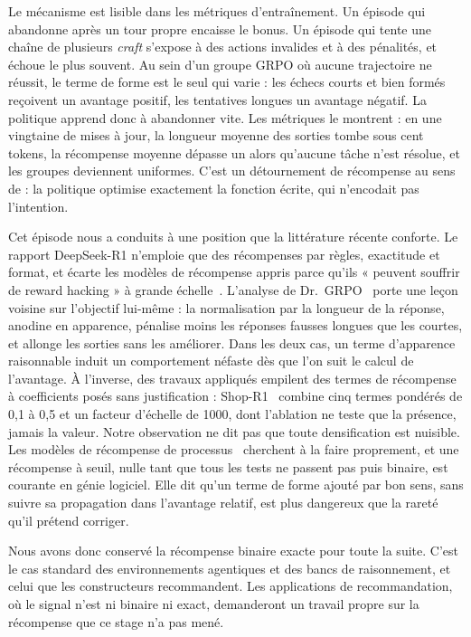\documentclass[11pt,a4paper]{article}
\begin{document}
Le mécanisme est lisible dans les métriques d'entraînement. Un épisode qui abandonne après un tour propre encaisse le bonus. Un épisode qui tente une chaîne de plusieurs \emph{craft} s'expose à des actions invalides et à des pénalités, et échoue le plus souvent. Au sein d'un groupe GRPO où aucune trajectoire ne réussit, le terme de forme est le seul qui varie : les échecs courts et bien formés reçoivent un avantage positif, les tentatives longues un avantage négatif. La politique apprend donc à abandonner vite. Les métriques le montrent : en une vingtaine de mises à jour, la longueur moyenne des sorties tombe sous cent tokens, la récompense moyenne dépasse un alors qu'aucune tâche n'est résolue, et les groupes deviennent uniformes. C'est un détournement de récompense au sens de \cite{skalse2022defining} : la politique optimise exactement la fonction écrite, qui n'encodait pas l'intention.


Cet épisode nous a conduits à une position que la littérature récente conforte. Le rapport DeepSeek-R1 n'emploie que des récompenses par règles, exactitude et format, et écarte les modèles de récompense appris parce qu'ils « peuvent souffrir de reward hacking » à grande échelle~\cite{deepseekr1_2025}. L'analyse de Dr.~GRPO~\cite{liu2025drgrpo} porte une leçon voisine sur l'objectif lui-même : la normalisation par la longueur de la réponse, anodine en apparence, pénalise moins les réponses fausses longues que les courtes, et allonge les sorties sans les améliorer. Dans les deux cas, un terme d'apparence raisonnable induit un comportement néfaste dès que l'on suit le calcul de l'avantage. À l'inverse, des travaux appliqués empilent des termes de récompense à coefficients posés sans justification : Shop-R1~\cite{shopr1_2026} combine cinq termes pondérés de 0{,}1 à 0{,}5 et un facteur d'échelle de 1000, dont l'ablation ne teste que la présence, jamais la valeur. Notre observation ne dit pas que toute densification est nuisible. Les modèles de récompense de processus~\cite{lightman2023verify} cherchent à la faire proprement, et une récompense à seuil, nulle tant que tous les tests ne passent pas puis binaire, est courante en génie logiciel. Elle dit qu'un terme de forme ajouté par bon sens, sans suivre sa propagation dans l'avantage relatif, est plus dangereux que la rareté qu'il prétend corriger.

Nous avons donc conservé la récompense binaire exacte pour toute la suite. C'est le cas standard des environnements agentiques et des bancs de raisonnement, et celui que les constructeurs recommandent. Les applications de recommandation, où le signal n'est ni binaire ni exact, demanderont un travail propre sur la récompense que ce stage n'a pas mené.
\end{document}
